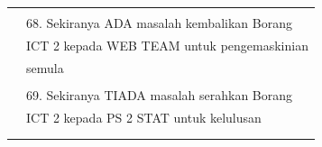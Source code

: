 \documentclass[
]{article}
\begin{document}
\begin{longtable}[]{@{}ll@{}}
\begin{minipage}[t]{0.71\columnwidth}
\strut
\end{minipage}\tabularnewline
\begin{minipage}[t]{0.23\columnwidth}\raggedright
\strut
\end{minipage} & \begin{minipage}[t]{0.71\columnwidth}\raggedright
68. Sekiranya ADA masalah kembalikan Borang\strut
\end{minipage}\tabularnewline
\begin{minipage}[t]{0.23\columnwidth}\raggedright
\strut
\end{minipage} & \begin{minipage}[t]{0.71\columnwidth}\raggedright
ICT 2 kepada WEB TEAM untuk pengemaskinian\strut
\end{minipage}\tabularnewline
\begin{minipage}[t]{0.23\columnwidth}\raggedright
\strut
\end{minipage} & \begin{minipage}[t]{0.71\columnwidth}\raggedright
semula\strut
\end{minipage}\tabularnewline
\begin{minipage}[t]{0.23\columnwidth}\raggedright
\strut
\end{minipage} & \begin{minipage}[t]{0.71\columnwidth}\raggedright
\strut
\end{minipage}\tabularnewline
\begin{minipage}[t]{0.23\columnwidth}\raggedright
\strut
\end{minipage} & \begin{minipage}[t]{0.71\columnwidth}\raggedright
69. Sekiranya TIADA masalah serahkan Borang\strut
\end{minipage}\tabularnewline
\begin{minipage}[t]{0.23\columnwidth}\raggedright
\strut
\end{minipage} & \begin{minipage}[t]{0.71\columnwidth}\raggedright
ICT 2 kepada PS 2 STAT untuk kelulusan\strut
\end{minipage}\tabularnewline
\begin{minipage}[t]{0.23\columnwidth}\raggedright
\strut
\end{minipage} & \begin{minipage}[t]{0.71\columnwidth}\raggedright
\strut
\end{minipage}\tabularnewline
\begin{minipage}[t]{0.23\columnwidth}\raggedright
\strut
\end{minipage} & \begin{minipage}[t]{0.71\columnwidth}\raggedright

\end{minipage}
\end{longtable}
\end{document}
